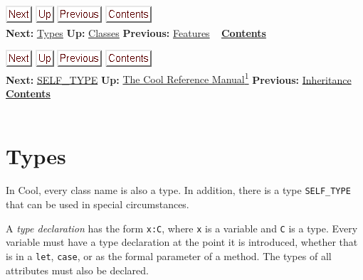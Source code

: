 \documentclass[]{article}
\begin{document}
\href{node7.html}{\includegraphics{next.png}}
\href{node4.html}{\includegraphics{up.png}}
\href{node5.html}{\includegraphics{prev.png}}
\href{node1.html}{\includegraphics{contents.png}} \\ \textbf{Next:}
\href{node7.html}{Types} \textbf{Up:} \href{node4.html}{Classes}
\textbf{Previous:} \href{node5.html}{Features} ~
\textbf{\href{node1.html}{Contents}}

\href{node8.html}{\includegraphics{next.png}}
\href{cool-manual.html}{\includegraphics{up.png}}
\href{node6.html}{\includegraphics{prev.png}}
\href{node1.html}{\includegraphics{contents.png}} \\ \textbf{Next:}
\href{node8.html}{SELF\_TYPE} \textbf{Up:} \href{cool-manual.html}{The
Cool Reference Manual\textsuperscript{1}} \textbf{Previous:}
\href{node6.html}{Inheritance} ~ \textbf{\href{node1.html}{Contents}} \\
\\

\section{Types}

In Cool, every class name is also a type. In addition, there is a type
\texttt{SELF\_TYPE} that can be used in special circumstances.

A \emph{type declaration} has the form \texttt{x:C}, where \texttt{x} is
a variable and \texttt{C} is a type. Every variable must have a type
declaration at the point it is introduced, whether that is in a
\texttt{let}, \texttt{case}, or as the formal parameter of a method. The
types of all attributes must also be declared.
\end{document}
